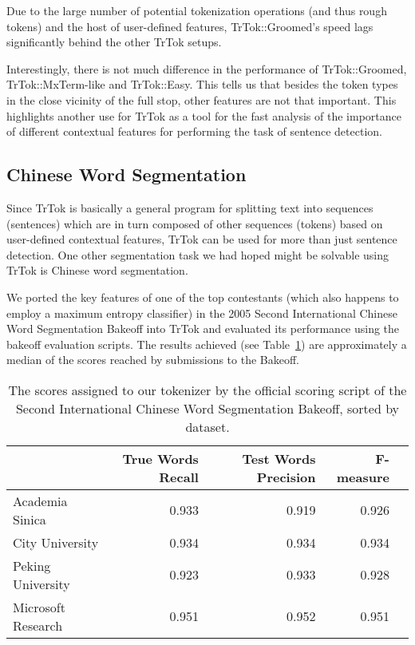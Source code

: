 Due to the large number of potential tokenization operations (and thus
rough tokens) and the host of user-defined features, TrTok::Groomed's
speed lags significantly behind the other TrTok setups.

Interestingly, there is not much difference in the performance of
TrTok::Groomed, TrTok::MxTerm-like and TrTok::Easy. This tells us that
besides the token types in the close vicinity of the full stop, other
features are not that important. This highlights another use for TrTok
as a tool for the fast analysis of the importance of different
contextual features for performing the task of sentence detection.

\subsection{Chinese Word Segmentation}

Since TrTok is basically a general program for splitting text into
sequences (sentences) which are in turn composed of other sequences
(tokens) based on user-defined contextual features, TrTok can be used
for more than just sentence detection. One other segmentation task we
had hoped might be solvable using TrTok is Chinese word segmentation.

We ported the key features of one of the top contestants (which also
happens to employ a maximum entropy classifier)
\cite{seg-chinese-maxent} in the 2005 Second International Chinese
Word Segmentation Bakeoff into TrTok and evaluated its performance
using the bakeoff evaluation scripts. The results achieved (see
Table~\ref{tbl:bakeoff-score}) are approximately a median of the
scores reached by submissions to the Bakeoff.

\begin{table}
  \begin{center}
    \begin{tabular}{ | l | r | r | r | r | }
      \hline
      & True Words Recall & Test Words Precision & F-measure \\ \hline
      Academia Sinica & 0.933 & 0.919 & 0.926 \\ \hline
      City University & 0.934 & 0.934 & 0.934 \\ \hline
      Peking University & 0.923 & 0.933 & 0.928 \\ \hline
      Microsoft Research & 0.951 & 0.952 & 0.951 \\
      \hline
    \end{tabular}
  \end{center}
  \caption[Chinese Word Segmentation scores]
    {The scores assigned to our tokenizer by the official scoring script of the
    Second International Chinese Word Segmentation Bakeoff, sorted by dataset.}
  \label{tbl:bakeoff-score}
\end{table}

